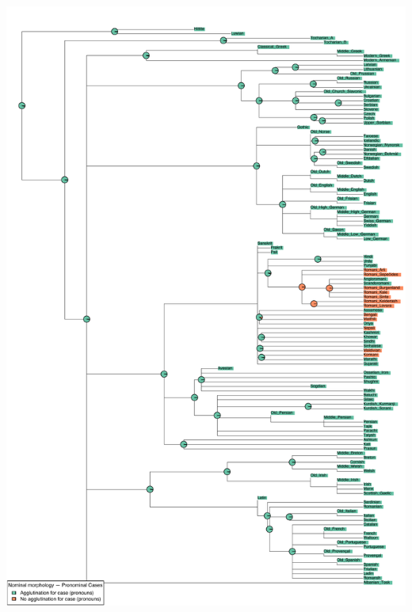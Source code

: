 \includegraphics[width=.9\linewidth]{supp-graphics/NominalmorphologyPronominalCasesAGGLCASENR.pdf}

